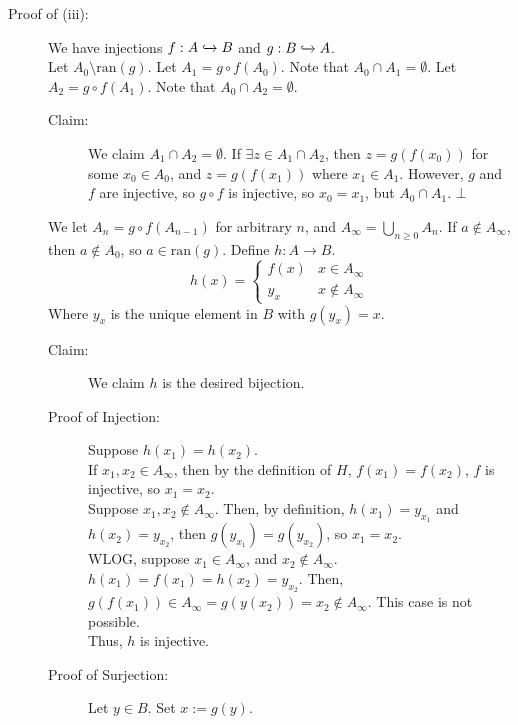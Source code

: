 \documentclass[10pt]{extarticle}
\begin{document}
      \begin{description}
        \item[Proof of (iii):] We have injections $f: A\xhookrightarrow{}B$ and $g:B\xhookrightarrow{} A$.\\

          Let $A_0 \setminus \text{ran}(g)$. Let $A_1 = g\circ f(A_0)$. Note that $A_0 \cap A_1 = \emptyset$. Let $A_2 = g\circ f(A_1)$. Note that $A_0\cap A_2 =\emptyset$.
          \begin{description}
            \item[Claim:] We claim $A_1 \cap A_2 = \emptyset$. If $\exists z\in A_1\cap A_2$, then $z = g(f(x_0))$ for some $x_0 \in A_0$, and $z = g(f(x_1))$ where $x_1\in A_1$. However, $g$ and $f$ are injective, so $g\circ f$ is injective, so $x_0 = x_1$, but $A_0\cap A_1$. $\bot$
          \end{description}
          We let $A_n = g\circ f(A_{n-1})$ for arbitrary $n$, and $A_{\infty} = \bigcup_{n\geq 0} A_n$. If $a\notin A_{\infty}$, then $a\notin A_0$, so $a\in \text{ran}(g)$. Define $h: A\rightarrow B$.
          \[
            h(x) = \begin{cases}
              f(x) & x\in A_{\infty}\\
              y_x & x\notin A_{\infty}
            \end{cases}
          \] 
          Where $y_x$ is the unique element in $B$ with $g(y_x) = x$.
          \begin{description}
            \item[Claim:] We claim $h$ is the desired bijection.
            \item[Proof of Injection:] Suppose $h(x_1) = h(x_2)$.\\

              If $x_1,x_2\in A_{\infty}$, then by the definition of $H$, $f(x_1) = f(x_2)$, $f$ is injective, so $x_1 = x_2$.\\

              Suppose $x_1,x_2\notin A_{\infty}$. Then, by definition, $h(x_1) = y_{x_1}$ and $h(x_2) = y_{x_2}$, then $g(y_{x_1}) = g(y_{x_2})$, so $x_1 = x_2$.\\

              WLOG, suppose $x_1\in A_{\infty}$, and $x_2 \notin A_{\infty}$. $h(x_1) = f(x_1) = h(x_2) = y_{x_2}$. Then, $g(f(x_1))\in A_{\infty} = g(y(x_2)) = x_2\notin A_{\infty}$. This case is not possible.\\

              Thus, $h$ is injective.
            \item[Proof of Surjection:] Let $y\in B$. Set $x := g(y)$.\\


\end{description}
\end{description}
\end{document}
